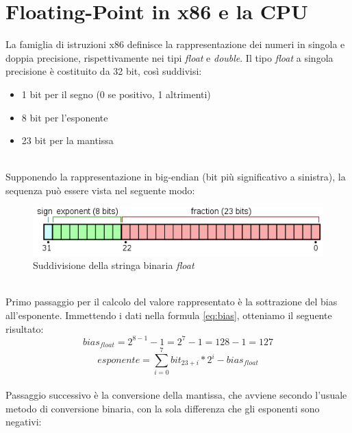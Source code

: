 \documentclass[Lau, oneside]{sapthesis}%
\begin{document}
\section{Floating-Point in x86 e la CPU}
La famiglia di istruzioni x86 definisce la rappresentazione dei numeri in singola e doppia precisione, rispettivamente nei tipi \textit{float} e \textit{double}.
\newline \newline
Il tipo \textit{float} a singola precisione è costituito da 32 bit, così suddivisi:
\begin{itemize}
    \item 1 bit per il segno (0 se positivo, 1 altrimenti)
    \item 8 bit per l'esponente
    \item 23 bit per la mantissa
\end{itemize}
\ \\
Supponendo la rappresentazione in big-endian (bit più significativo a sinistra), la sequenza può essere vista nel seguente modo:
\newline
\begin{figure}[h]
\centering
\includegraphics[scale=0.8]{foto/float.png}
\caption{Suddivisione della stringa binaria \textit{float} \cite{ref:float}}
\end{figure}
\ \\ \newline
Primo passaggio per il calcolo del valore rappresentato è la sottrazione del bias all'esponente.
\newline
Immettendo i dati nella formula \eqref{eq:bias}, otteniamo il seguente risultato:
\ \\
\begin{equation}
    bias_{float} = 2^{8-1}-1 = 2^{7}-1 = 128-1 = 127
\end{equation}
\begin{equation}
   esponente = \sum_{i=0}^{7} bit_{23+i}*2^{i} - bias_{float}
\end{equation}
\ \\
\newline
Passaggio successivo è la conversione della mantissa, che avviene secondo l'usuale metodo di conversione binaria, con la sola differenza che gli esponenti sono negativi:
\end{document}
